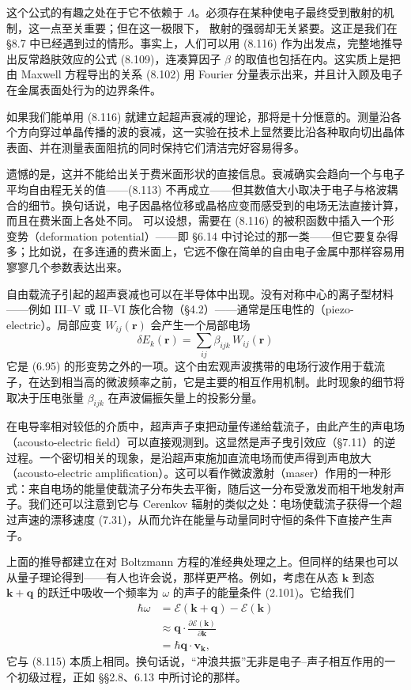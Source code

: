 这个公式的有趣之处在于它不依赖于 $\Lambda$。必须存在某种使电子最终受到散射的机制，这一点至关重要；但在这一极限下，
散射的强弱却无关紧要。这正是我们在 §8.7 中已经遇到过的情形。事实上，人们可以用 (8.116) 作为出发点，完整地推导出反常趋肤效应的公式 (8.109)，连凑算因子 $\beta$ 的取值也包括在内。这实质上是把由 Maxwell 方程导出的关系 (8.102) 用 Fourier 分量表示出来，并且计入顾及电子在金属表面处行为的边界条件。

如果我们能单用 (8.116) 就建立起超声衰减的理论，那将是十分惬意的。测量沿各个方向穿过单晶传播的波的衰减，这一实验在技术上显然要比沿各种取向切出晶体表面、并在测量表面阻抗的同时保持它们清洁完好容易得多。

遗憾的是，这并不能给出关于费米面形状的直接信息。衰减确实会趋向一个与电子平均自由程无关的值——(8.113) 不再成立——但其数值大小取决于电子与格波耦合的细节。换句话说，电子因晶格位移或晶格应变而感受到的电场无法直接计算，而且在费米面上各处不同。
可以设想，需要在 (8.116) 的被积函数中插入一个形变势（deformation potential）——即 §6.14 中讨论过的那一类——但它要复杂得多；比如说，在多连通的费米面上，它远不像在简单的自由电子金属中那样容易用寥寥几个参数表达出来。

自由载流子引起的超声衰减也可以在半导体中出现。没有对称中心的离子型材料——例如 III–V 或 II–VI 族化合物（§4.2）——通常是压电性的（piezo-electric）。局部应变 $W_{ij}(\mathbf{r})$ 会产生一个局部电场
\begin{equation*}
\delta E_k(\mathbf{r}) = \sum_{ij}\beta_{ijk}\,W_{ij}(\mathbf{r}) \tag{8.117}
\end{equation*}
它是 (6.95) 的形变势之外的一项。这个由宏观声波携带的电场行波作用于载流子，在达到相当高的微波频率之前，它是主要的相互作用机制。此时现象的细节将取决于压电张量 $\beta_{ijk}$ 在声波偏振矢量上的投影分量。

在电导率相对较低的介质中，超声声子束把动量传递给载流子，由此产生的声电场（acousto-electric field）可以直接观测到。这显然是声子曳引效应（§7.11）的逆过程。一个密切相关的现象，是沿超声束施加直流电场而使声得到声电放大（acousto-electric amplification）。这可以看作微波激射（maser）作用的一种形式：来自电场的能量使载流子分布失去平衡，随后这一分布受激发而相干地发射声子。我们还可以注意到它与 Cerenkov 辐射的类似之处：电场使载流子获得一个超过声速的漂移速度 (7.31)，从而允许在能量与动量同时守恒的条件下直接产生声子。

上面的推导都建立在对 Boltzmann 方程的准经典处理之上。但同样的结果也可以从量子理论得到——有人也许会说，那样更严格。例如，考虑在从态 $\mathbf{k}$ 到态 $\mathbf{k}+\mathbf{q}$ 的跃迁中吸收一个频率为 $\omega$ 的声子的能量条件 (2.101)。它给我们
\begin{align*}
\hbar\omega &= \mathcal{E}(\mathbf{k}+\mathbf{q}) - \mathcal{E}(\mathbf{k}) \\
&\approx \mathbf{q}\cdot\frac{\partial\mathcal{E}(\mathbf{k})}{\partial\mathbf{k}} \\
&= \hbar\mathbf{q}\cdot\mathbf{v}_{\mathbf{k}}, \tag{8.118}
\end{align*}
它与 (8.115) 本质上相同。换句话说，“冲浪共振”无非是电子–声子相互作用的一个初级过程，正如 §§2.8、6.13 中所讨论的那样。

